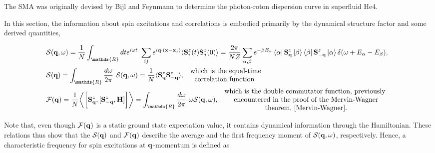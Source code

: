 \documentclass{homework}
\begin{document}
\begin{tcolorbox}[colback = LimeGreen, title = Historical Context]

The SMA was originally devised by Bijl and Feynmann  to determine the photon-roton dispersion curve in superfluid He4.

\end{tcolorbox}

In this section, the information about spin excitations and correlations is embodied primarily by the dynamical structure factor and some derived quantities, 

\begin{equation}
\begin{split}
    &\mathcal{S}({\bf q}, \omega) = \frac{1}{N} \int_{\mathds{R}} dt e^{i \omega t} \blanky \sum_{ij} e^{i {\bf q} \cdot ({\bf x} - {\bf x}_j)} \langle \spin_i^z(t) \spin_j^z(0) \rangle = \frac{2\pi}{NZ} \sum_{\alpha, \beta} e^{-\beta E_{\alpha}} \bra{\alpha} \spin_{{\bf q}}^z \ket{\beta} \bra{\beta} \spin^z_{-{\bf q}} \ket{\alpha} \delta(\omega + E_{\alpha} - E_{\beta}), \\
    &\mathcal{S}({\bf q}) = \int_{\mathds{R}} \frac{d\omega}{2\pi} \blanky \mathcal{S}({\bf q}, \omega) = \frac{1}{N} \langle \spin_{{\bf q}}^z \spin_{-{\bf q}}^z \rangle,  \begin{array}{c}
         \textnormal{ which is the equal-time}  \\
         \textnormal{ correlation function }
    \end{array} \\
    &\mathcal{F}({\bf q}) = \frac{1}{N} \bigg \langle \bigg[\spin_{{\bf q}}^z, [\spin_{-{\bf q}}^z, {\bf H}]\bigg] \bigg \rangle = \int_{\mathds{R}} \frac{d\omega}{2\pi} \blanky \omega \mathcal{S}({\bf q}, \omega), \begin{array}{cc}
         \textnormal{ which is the double commutator function, previously } \\
         \textnormal{  encountered in the proof of the Mervin-Wagner} \\
         \textnormal{ theorem,  \cref{Mervin-Wagner}.}
    \end{array}
    \label{Goldstone_spin_dynamical_factors}
\end{split}
\end{equation}

Note that, even though $\mathcal{F}({\bf q})$ is a static ground state expectation value, it contains dynamical information through the Hamiltonian. These relations thus show that the $\mathcal{S}({\bf q})$ and $\mathcal{F}({\bf q})$ describe the average and the first frequency moment of $\mathcal{S}({\bf q}, \omega)$, respectively. Hence, a characteristic frequency for spin excitations at ${\bf q}$-momentum is defined as 
\end{document}
